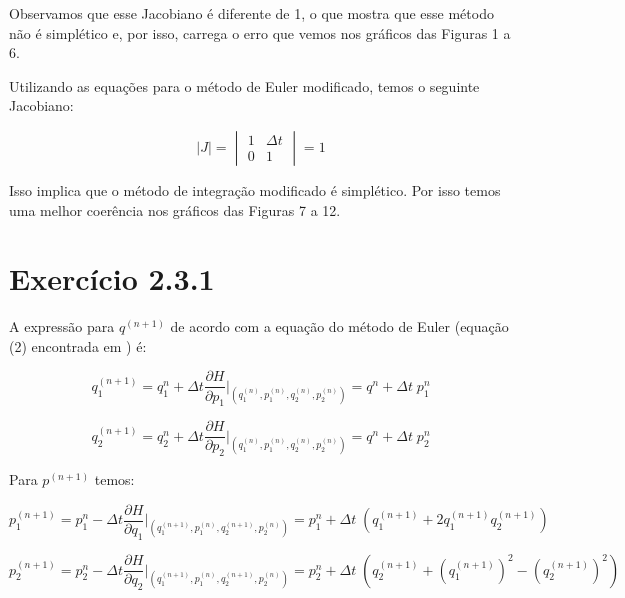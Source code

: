 \documentclass[a4paper,10pt]{article}
\begin{document}
 Observamos que esse Jacobiano é diferente de 1, o que mostra que esse método não é simplético e, por isso, carrega o erro que
 vemos nos gráficos das Figuras 1 a 6.

 Utilizando as equações para o método de Euler modificado, temos o seguinte Jacobiano:

 \begin{equation}
   |J| = \begin{vmatrix}
          1 & \Delta t \\
          0 & 1
         \end{vmatrix}
         = 1
 \end{equation}
 
 Isso implica que o método de integração modificado é simplético. Por isso temos uma melhor coerência nos gráficos das Figuras 7 a 12.

\section*{Exercício 2.3.1}

A expressão para $q^{(n+1)}$ de acordo com a equação do método de Euler (equação (2) encontrada em \cite{estudodirigido1}) é:

\begin{equation}
  q_1^{(n+1)} = q_1^n + \Delta t \frac{\partial H}{\partial p_1}\Big|_{(q_1^{(n)},p_1^{(n)},q_2^{(n)},p_2^{(n)})} = q^n + \Delta t \; p_1^n
\end{equation}

\begin{equation}
  q_2^{(n+1)} = q_2^n + \Delta t \frac{\partial H}{\partial p_2}\Big|_{(q_1^{(n)},p_1^{(n)},q_2^{(n)},p_2^{(n)})} = q^n + \Delta t \; p_2^n
\end{equation}

Para $p^{(n+1)}$ temos:

\begin{equation}
  p_1^{(n+1)} = p_1^n - \Delta t \frac{\partial H}{\partial q_1}\Big|_{(q_1^{(n+1)},p_1^{(n)},q_2^{(n+1)},p_2^{(n)})} = p_1^n + \Delta t \; (q_1^{(n+1)} + 2 q_1^{(n+1)} q_2^{(n+1)})
\end{equation}

\begin{equation}
  p_2^{(n+1)} = p_2^n - \Delta t \frac{\partial H}{\partial q_2}\Big|_{(q_1^{(n+1)},p_1^{(n)},q_2^{(n+1)},p_2^{(n)})} = p_2^n + \Delta t \; (q_2^{(n+1)} + (q_1^{(n+1)})^2 - (q_2^{(n+1)})^2)
\end{equation}
\end{document}
